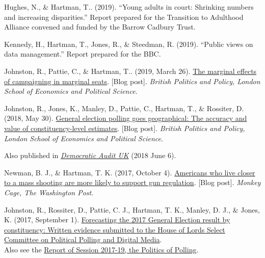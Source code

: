 \documentclass[12pt]{article}
\begin{document}
\begin{bibenum}
\item Hughes, N., \& {Hartman, T.}. (2019). ``Young adults in court: Shrinking numbers and increasing disparities.'' Report prepared for the Transition to Adulthood Alliance convened and funded by the Barrow Cadbury Trust.

\item Kennedy, H., {Hartman, T.}, Jones, R., \& Steedman, R. (2019). ``Public views on data management.'' Report prepared for the BBC.

\item Johnston, R., Pattie, C., \& {Hartman, T.}. (2019, March 26).
\href{https://blogs.lse.ac.uk/politicsandpolicy/the-marginal-effects-of-campaigning-in-marginal-seats/}
{The marginal effects of campaigning in marginal seats}. 
[Blog post]. \textit{British Politics and Policy, London School of Economics and Political Science}.

\item Johnston, R., Jones, K., Manley, D.,  Pattie, C., {Hartman, T.}, \& Rossiter, D. (2018, May 30).
\href{http://blogs.lse.ac.uk/politicsandpolicy/constituency-level-estimates/}
{General election polling goes geographical: The accuracy and value of constituency-level estimates}. 
[Blog post]. \textit{British Politics and Policy, London School of Economics and Political Science}.

Also published in 
\href{http://www.democraticaudit.com/2018/06/06/general-election-polling-goes-geographical-the-accuracy-and-value-of-constituency-level-estimates/}{\textit{Democratic Audit UK}} (2018 June 6). 

\item Newman, B. J., \& Hartman, T. K. (2017, October 4). 
\href{https://www.washingtonpost.com/news/monkey-cage/wp/2017/10/03/americans-who-live-closer-to-a-mass-shooting-are-more-likely-to-support-gun-regulation/}{Americans who live closer to a mass shooting are more likely to support gun regulation}. [Blog post].
    \textit{Monkey Cage, The Washington Post}.  

\item Johnston, R., Rossiter, D., Pattie, C. J., {Hartman, T. K.}, Manley, D. J., \& Jones, K. (2017, September 1).
\href{https://www.parliament.uk/documents/lords-committees/political-polling-digital-media/Political-Polling-and-Digital-Media-Committee-Oral-and-Written-Evidence.pdf}
{Forecasting the 2017 General Election result by constituency: Written evidence submitted to the House of Lords Select Committee on Political Polling and Digital Media}.\\
Also see the \href{https://publications.parliament.uk/pa/ld201719/ldselect/ldppdm/106/106.pdf}
{Report of Session 2017-19, the Politics of Polling}.


\end{bibenum}
\end{document}
